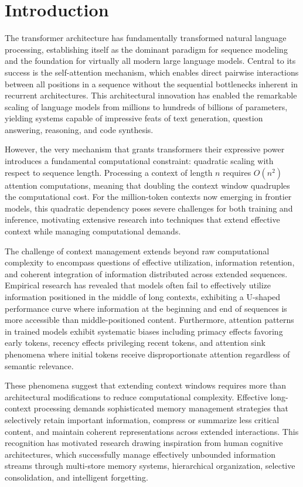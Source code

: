 \documentclass[11pt,letterpaper]{article}
\begin{document}
\newpage

\section{Introduction}
\label{sec:introduction}

The transformer architecture has fundamentally transformed natural language processing, establishing itself as the dominant paradigm for sequence modeling and the foundation for virtually all modern large language models. Central to its success is the self-attention mechanism, which enables direct pairwise interactions between all positions in a sequence without the sequential bottlenecks inherent in recurrent architectures. This architectural innovation has enabled the remarkable scaling of language models from millions to hundreds of billions of parameters, yielding systems capable of impressive feats of text generation, question answering, reasoning, and code synthesis.

However, the very mechanism that grants transformers their expressive power introduces a fundamental computational constraint: quadratic scaling with respect to sequence length. Processing a context of length $n$ requires $O(n^2)$ attention computations, meaning that doubling the context window quadruples the computational cost. For the million-token contexts now emerging in frontier models, this quadratic dependency poses severe challenges for both training and inference, motivating extensive research into techniques that extend effective context while managing computational demands.

The challenge of context management extends beyond raw computational complexity to encompass questions of effective utilization, information retention, and coherent integration of information distributed across extended sequences. Empirical research has revealed that models often fail to effectively utilize information positioned in the middle of long contexts, exhibiting a U-shaped performance curve where information at the beginning and end of sequences is more accessible than middle-positioned content. Furthermore, attention patterns in trained models exhibit systematic biases including primacy effects favoring early tokens, recency effects privileging recent tokens, and attention sink phenomena where initial tokens receive disproportionate attention regardless of semantic relevance.

These phenomena suggest that extending context windows requires more than architectural modifications to reduce computational complexity. Effective long-context processing demands sophisticated memory management strategies that selectively retain important information, compress or summarize less critical content, and maintain coherent representations across extended interactions. This recognition has motivated research drawing inspiration from human cognitive architectures, which successfully manage effectively unbounded information streams through multi-store memory systems, hierarchical organization, selective consolidation, and intelligent forgetting.
\end{document}
